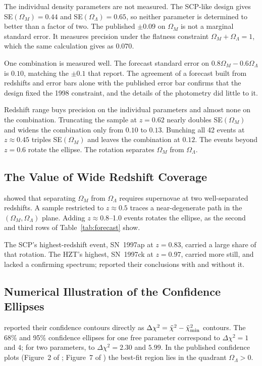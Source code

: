 \documentclass[12pt]{article}
\begin{document}
The individual density parameters are not measured.  The SCP-like design gives
SE$(\Omega_M) = 0.44$ and SE$(\Omega_\Lambda) = 0.65$, so neither parameter is
determined to better than a factor of two.  The published $\pm0.09$ on
$\Omega_M$ is not a marginal standard error.  It measures precision under the
flatness constraint $\Omega_M + \Omega_\Lambda = 1$, which the same
calculation gives as $0.070$.

One combination is measured well.  The forecast standard error on
$0.8\Omega_M - 0.6\Omega_\Lambda$ is $0.10$, matching the $\pm0.1$ that
\citet{Perlmutter1999} report.  The agreement of a forecast built from
redshifts and error bars alone with the published error bar confirms that the
design fixed the 1998 constraint, and the details of the photometry did
little to it.

Redshift range buys precision on the individual parameters and almost none on
the combination.  Truncating the sample at $z = 0.62$ nearly doubles
SE$(\Omega_M)$ and widens the combination only from $0.10$ to $0.13$.  Bunching
all 42 events at $z \approx 0.45$ triples SE$(\Omega_M)$ and leaves the
combination at $0.12$.  The events beyond $z = 0.6$ rotate the ellipse.  The
rotation separates $\Omega_M$ from $\Omega_\Lambda$.

\subsection{The Value of Wide Redshift Coverage}

\citet{GoobarPerlmutter1995} showed that separating $\Omega_M$ from
$\Omega_\Lambda$ requires supernovae at two well-separated redshifts.  A sample
restricted to $z\approx 0.5$ traces a near-degenerate path in the
$(\Omega_M,\Omega_\Lambda)$ plane.  Adding $z\approx 0.8$--1.0 events rotates
the ellipse, as the second and third rows of Table~\ref{tab:forecast} show.

The SCP's highest-redshift event, SN~1997ap at $z = 0.83$, carried a large
share of that rotation.  The HZT's highest, SN~1997ck at $z = 0.97$, carried
more still, and lacked a confirming spectrum; \citet{Riess1998} reported their
conclusions with and without it.

\subsection{Numerical Illustration of the Confidence Ellipses}

\citet{Perlmutter1999} reported their confidence contours directly
as $\Delta\chi^2 = \tilde\chi^2 - \tilde\chi^2_{\rm min}$ contours.
The 68\% and 95\% confidence ellipses for one free parameter correspond
to $\Delta\chi^2 = 1$ and $4$; for two parameters, to
$\Delta\chi^2 = 2.30$ and $5.99$.  In the published confidence plots
(Figure~2 of \citealt{Perlmutter1999}; Figure~7 of \citealt{Riess1998}) the
best-fit region lies in the quadrant $\Omega_\Lambda > 0$.
\end{document}
